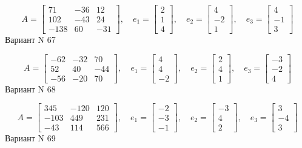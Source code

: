 \documentclass[11pt]{report}
\begin{document}
$$A = \left[\begin{matrix}71 & -36 & 12\\102 & -43 & 24\\-138 & 60 & -31\end{matrix}\right],\quad e_1 = \left[\begin{matrix}2\\1\\4\end{matrix}\right],\quad e_2 = \left[\begin{matrix}4\\-2\\1\end{matrix}\right],\quad e_3 = \left[\begin{matrix}4\\-1\\3\end{matrix}\right]$$Вариант N 67

$$A = \left[\begin{matrix}-62 & -32 & 70\\52 & 40 & -44\\-56 & -20 & 70\end{matrix}\right],\quad e_1 = \left[\begin{matrix}4\\4\\-2\end{matrix}\right],\quad e_2 = \left[\begin{matrix}2\\4\\1\end{matrix}\right],\quad e_3 = \left[\begin{matrix}-3\\-2\\4\end{matrix}\right]$$Вариант N 68

$$A = \left[\begin{matrix}345 & -120 & 120\\-103 & 449 & 231\\-43 & 114 & 566\end{matrix}\right],\quad e_1 = \left[\begin{matrix}-2\\-3\\-1\end{matrix}\right],\quad e_2 = \left[\begin{matrix}-3\\4\\2\end{matrix}\right],\quad e_3 = \left[\begin{matrix}3\\-4\\3\end{matrix}\right]$$Вариант N 69
\end{document}
